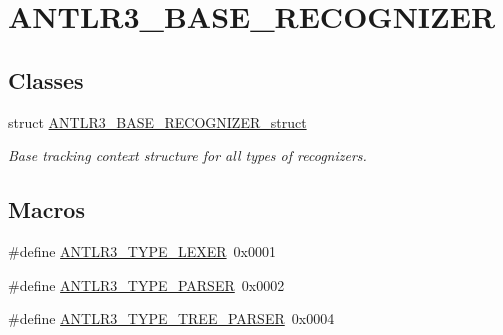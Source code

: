 \hypertarget{group___a_n_t_l_r3___b_a_s_e___r_e_c_o_g_n_i_z_e_r}{\section{A\-N\-T\-L\-R3\-\_\-\-B\-A\-S\-E\-\_\-\-R\-E\-C\-O\-G\-N\-I\-Z\-E\-R}
\label{group___a_n_t_l_r3___b_a_s_e___r_e_c_o_g_n_i_z_e_r}
}
\subsection*{Classes}
\begin{DoxyCompactItemize}
\item 
struct \hyperlink{struct_a_n_t_l_r3___b_a_s_e___r_e_c_o_g_n_i_z_e_r__struct}{A\-N\-T\-L\-R3\-\_\-\-B\-A\-S\-E\-\_\-\-R\-E\-C\-O\-G\-N\-I\-Z\-E\-R\-\_\-struct}
\begin{DoxyCompactList}\small\item\em Base tracking context structure for all types of recognizers. \end{DoxyCompactList}\end{DoxyCompactItemize}
\subsection*{Macros}
\begin{DoxyCompactItemize}
\item 
\#define \hyperlink{group___a_n_t_l_r3___b_a_s_e___r_e_c_o_g_n_i_z_e_r_ga63faeec6cee4f885c4b90a6d0cc2f5b4}{A\-N\-T\-L\-R3\-\_\-\-T\-Y\-P\-E\-\_\-\-L\-E\-X\-E\-R}~0x0001
\item 
\#define \hyperlink{group___a_n_t_l_r3___b_a_s_e___r_e_c_o_g_n_i_z_e_r_gafee8a3d7d292291a4cb15619c6bca466}{A\-N\-T\-L\-R3\-\_\-\-T\-Y\-P\-E\-\_\-\-P\-A\-R\-S\-E\-R}~0x0002
\item 
\#define \hyperlink{group___a_n_t_l_r3___b_a_s_e___r_e_c_o_g_n_i_z_e_r_ga3ff933756e4fc6d8fd9a5a8a0d67bb98}{A\-N\-T\-L\-R3\-\_\-\-T\-Y\-P\-E\-\_\-\-T\-R\-E\-E\-\_\-\-P\-A\-R\-S\-E\-R}~0x0004
\end{DoxyCompactItemize}
